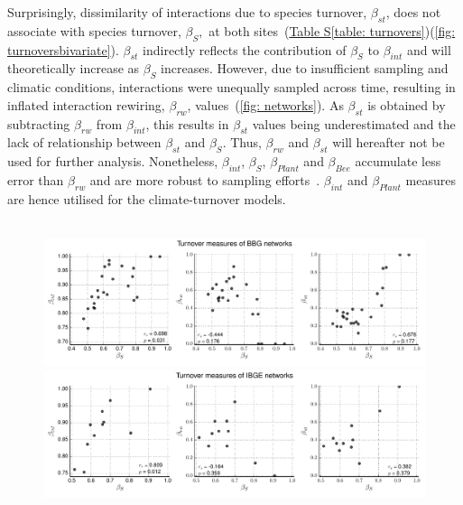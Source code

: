 \documentclass[11pt]{article}
\begin{document}
\newpage
Surprisingly, dissimilarity of interactions due to species turnover, $\beta_{st}$, does not associate with species turnover, $\beta_{S},$ at both sites~(\hyperref[table: turnovers]{Table S\ref{table: turnovers}})(\autoref{fig: turnoversbivariate}). $\beta_{st}$ indirectly reflects the contribution of $\beta_{S}$ to $\beta_{int}$ and will theoretically increase as $\beta_{S}$ increases. However, due to insufficient sampling and climatic conditions, interactions were unequally sampled across time, resulting in inflated interaction rewiring, $\beta_{rw}$, values~(\autoref{fig: networks}). As $\beta_{st}$ is obtained by subtracting $\beta_{rw}$ from $\beta_{int}$, this results in $\beta_{st}$ values being underestimated and the lack of relationship between $\beta_{st}$ and $\beta_{S}$. Thus, $\beta_{rw}$ and $\beta_{st}$ will hereafter not be used for further analysis. Nonetheless, $\beta_{int}$, $\beta_{S}$, $\beta_{Plant}$ and $\beta_{Bee}$ accumulate less error than $\beta_{rw}$ and are more robust to sampling efforts~\citep{Poisot2012}.  $\beta_{int}$ and $\beta_{Plant}$ measures are hence utilised for the climate-turnover models.\\
\\
\begin{figure}[h]
  \centering
    \includegraphics[width=1\textwidth]{turnoversbivariate(old).pdf}
    \includegraphics[width=1\textwidth]{turnoversbivariate(new).pdf}
       \label{fig: turnoversbivariate}
\end{figure}
\end{document}
